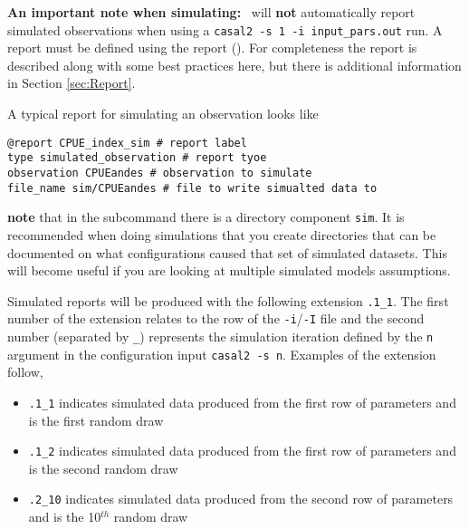 \textbf{An important note when simulating:} \CNAME\ will \textbf{not} automatically report simulated observations when using a \texttt{casal2 -s 1 -i input\_pars.out} run. A report must be defined using the  report (). For completeness the report is described along with some best practices here, but there is additional information in Section \ref{sec:Report}.


A typical report for simulating an observation looks like
\begin{verbatim}
@report CPUE_index_sim # report label
type simulated_observation # report tyoe
observation CPUEandes # observation to simulate
file_name sim/CPUEandes # file to write simualted data to
\end{verbatim}
%
\textbf{note} that in the subcommand  there is a directory component \texttt{sim}. It is recommended when doing simulations that you create directories that can be documented on what configurations caused that set of simulated datasets. This will become useful if you are looking at multiple simulated models assumptions.


Simulated reports will be produced with the following extension \texttt{.1\_1}. The first number of the extension relates to the row of the \texttt{-i}/\texttt{-I} file and the second number (separated by \texttt{\_}) represents the simulation iteration defined by the \texttt{n} argument in the configuration input \texttt{casal2 -s n}. Examples of the extension follow,
\begin{itemize}
	\item \texttt{.1\_1} indicates simulated data produced from the first row of parameters and is the first random draw
	\item \texttt{.1\_2} indicates simulated data produced from the first row of parameters and is the second random draw
	\item \texttt{.2\_10} indicates simulated data produced from the second row of parameters and is the 10\(^{th}\) random draw
\end{itemize}




